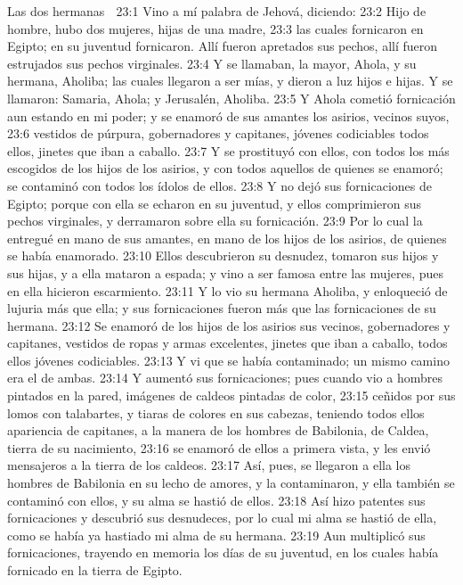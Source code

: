 Las dos hermanas  

23:1 Vino a mí palabra de Jehová, diciendo:  
23:2 Hijo de hombre, hubo dos mujeres, hijas de una madre,  
23:3 las cuales fornicaron en Egipto; en su juventud fornicaron. Allí fueron apretados sus pechos, allí fueron estrujados sus pechos virginales.  
23:4 Y se llamaban, la mayor, Ahola, y su hermana, Aholiba; las cuales llegaron a ser mías, y dieron a luz hijos e hijas. Y se llamaron: Samaria, Ahola; y Jerusalén, Aholiba.  
23:5 Y Ahola cometió fornicación aun estando en mi poder; y se enamoró de sus amantes los asirios, vecinos suyos,  
23:6 vestidos de púrpura, gobernadores y capitanes, jóvenes codiciables todos ellos, jinetes que iban a caballo.  
23:7 Y se prostituyó con ellos, con todos los más escogidos de los hijos de los asirios, y con todos aquellos de quienes se enamoró; se contaminó con todos los ídolos de ellos. 
23:8 Y no dejó sus fornicaciones de Egipto; porque con ella se echaron en su juventud, y ellos comprimieron sus pechos virginales, y derramaron sobre ella su fornicación.  
23:9 Por lo cual la entregué en mano de sus amantes, en mano de los hijos de los asirios, de quienes se había enamorado.  
23:10 Ellos descubrieron su desnudez, tomaron sus hijos y sus hijas, y a ella mataron a espada; y vino a ser famosa entre las mujeres, pues en ella hicieron escarmiento.  
23:11 Y lo vio su hermana Aholiba, y enloqueció de lujuria más que ella; y sus fornicaciones fueron más que las fornicaciones de su hermana.  
23:12 Se enamoró de los hijos de los asirios sus vecinos, gobernadores y capitanes, vestidos de ropas y armas excelentes, jinetes que iban a caballo, todos ellos jóvenes codiciables.  
23:13 Y vi que se había contaminado; un mismo camino era el de ambas.  
23:14 Y aumentó sus fornicaciones; pues cuando vio a hombres pintados en la pared, imágenes de caldeos pintadas de color,  
23:15 ceñidos por sus lomos con talabartes, y tiaras de colores en sus cabezas, teniendo todos ellos apariencia de capitanes, a la manera de los hombres de Babilonia, de Caldea, tierra de su nacimiento,  
23:16 se enamoró de ellos a primera vista, y les envió mensajeros a la tierra de los caldeos.  
23:17 Así, pues, se llegaron a ella los hombres de Babilonia en su lecho de amores, y la contaminaron, y ella también se contaminó con ellos, y su alma se hastió de ellos.  
23:18 Así hizo patentes sus fornicaciones y descubrió sus desnudeces, por lo cual mi alma se hastió de ella, como se había ya hastiado mi alma de su hermana.  
23:19 Aun multiplicó sus fornicaciones, trayendo en memoria los días de su juventud, en los cuales había fornicado en la tierra de Egipto.  
